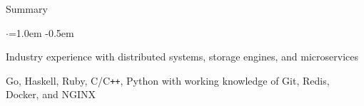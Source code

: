 \documentclass{resume} %
\begin{document}

\begin{rSection}{Summary}
  \vspace {0.5em}
  \begin{list}{$\cdot$}{\leftmargin=1.0em}
    \itemsep -0.5em \vspace{-0.5em}
    \item Industry experience with distributed systems, storage engines, and
      microservices
    \item Go, Haskell, Ruby, C/C\texttt{++}, Python with working knowledge of
      Git, Redis, Docker, and NGINX
  \end{list}
  \vspace{0.5em}
\end{rSection}

\end{document}
